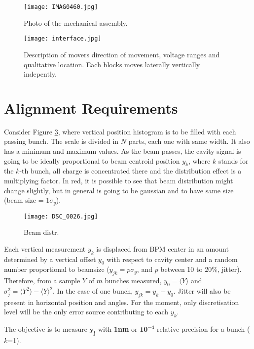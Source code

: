 \begin{figure}[htb]
 \begin{center}
\texttt{[image: IMAG0460.jpg]}\caption{Photo of the mechanical assembly.}\label{f-assembly}
\end{center}
\end{figure}
  \begin{figure}[htb]
 \begin{center}
\texttt{[image: interface.jpg]}\caption{Description of movers direction of movement, voltage ranges and qualitative location. Each blocks moves laterally vertically indepently.}\label{f-movers}
\end{center}
\end{figure}

\section{Alignment Requirements}
Consider Figure \ref{beamdist}, where vertical position histogram is to be filled with each passing bunch. The scale is divided in $N$ parts, each one with same width. It also has a minimum and maximum values. As the beam passes, the cavity signal is going to be ideally proportional to beam centroid position $y_k$, where $k$ stands for the $k$-th bunch, all charge is concentrated there and the distribution effect is a multiplying factor. In red, it is possible to see that beam distribution might change slightly, but in general is going to be gaussian and to have same size (beam size = 1$\sigma_y$).
\begin{figure}[htb]
\begin{center}
 \texttt{[image: DSC\_0026.jpg]}\caption{Beam distr.}\label{beamdist}
 \end{center}
\end{figure}
Each vertical measurement $y_k$ is displaced from BPM center in an amount determined by a vertical offset $y_0$ with respect to cavity center and a random number proportional to beamsize ($y_{jk}=p\sigma_y$, and $p$ between 10 to 20\%, jitter). Therefore, from a sample $Y$ of $m$ bunches measured, $y_0=\langle Y\rangle$ and $\sigma_j^2=\langle Y^2\rangle-\langle Y\rangle^2$. In the case of one bunch, $y_{jk}=y_k-y_0$. Jitter will also be present in horizontal position and angles. For the moment, only discretisation level will be the only error source contributing to each $y_k$.\par
The objective is to measure $\boldsymbol{y_j}$ with \textbf{1nm} or $\boldsymbol{10^{-4}}$ relative precision for a bunch ($k$=1).\par
